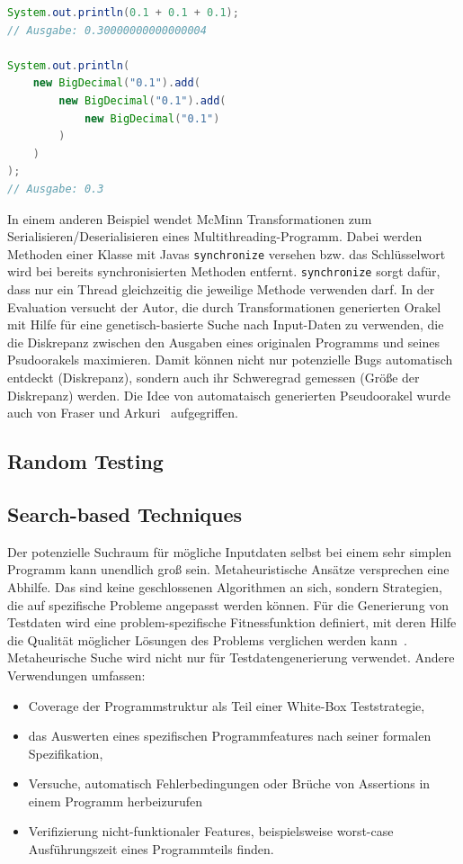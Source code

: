 \documentclass{article}
\begin{document}
\begin{lstlisting}[language=Java, caption=Comparing floating-point arithmetic in Java using double compared to BigDecimal~\cite{10.1145/1569901.1570127}, label=lst:java-transformations]
System.out.println(0.1 + 0.1 + 0.1);
// Ausgabe: 0.30000000000000004

System.out.println(
    new BigDecimal("0.1").add(
        new BigDecimal("0.1").add(
            new BigDecimal("0.1")
        )
    )
);
// Ausgabe: 0.3
\end{lstlisting}
In einem anderen Beispiel wendet McMinn Transformationen zum Serialisieren/Deserialisieren eines Multithreading-Programm. Dabei werden Methoden einer Klasse mit Javas \lstinline{synchronize} versehen bzw. das Schlüsselwort wird bei bereits synchronisierten Methoden entfernt. \lstinline{synchronize} sorgt dafür, dass nur ein Thread gleichzeitig die jeweilige Methode verwenden darf. In der Evaluation versucht der Autor, die durch Transformationen generierten Orakel mit Hilfe für eine genetisch-basierte Suche nach Input-Daten zu verwenden, die die Diskrepanz zwischen den Ausgaben eines originalen Programms und seines Psudoorakels maximieren. Damit können nicht nur potenzielle Bugs automatisch entdeckt (Diskrepanz), sondern auch ihr Schweregrad gemessen (Größe der Diskrepanz) werden. Die Idee von automataisch generierten Pseudoorakel wurde auch von Fraser und Arkuri~\cite{Fraser_2013} aufgegriffen. 

\subsection{Random Testing}
\subsection{Search-based Techniques}
Der potenzielle Suchraum für mögliche Inputdaten selbst bei einem sehr simplen Programm kann unendlich groß sein. Metaheuristische Ansätze versprechen eine Abhilfe. Das sind keine geschlossenen Algorithmen an sich, sondern Strategien, die auf spezifische Probleme angepasst werden können. Für die Generierung von Testdaten wird eine problem-spezifische Fitnessfunktion definiert, mit deren Hilfe die Qualität möglicher Lösungen des Problems verglichen werden kann~\cite{McMinn_2004}. Metaheurische Suche wird nicht nur für Testdatengenerierung verwendet. Andere Verwendungen umfassen:
\begin{itemize}
	\item Coverage der Programmstruktur als Teil einer White-Box Teststrategie,
	\item das Auswerten eines spezifischen Programmfeatures nach seiner formalen Spezifikation,
	\item Versuche, automatisch Fehlerbedingungen oder Brüche von Assertions in einem Programm herbeizurufen
	\item Verifizierung nicht-funktionaler Features, beispielsweise worst-case Ausführungszeit eines Programmteils finden.
\end{itemize}
\end{document}
